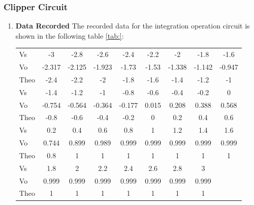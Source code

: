     \subsubsection{Clipper Circuit}
    \begin{enumerate}[I]
        \item \textbf{Data Recorded}\newline
            The recorded data for the integration operation circuit is shown in the following table \ref{tab:}:
            \begin{table}[H]
                \centering
                \begin{tabular}{l|cccccccc}
                    \hline
                    \midrule
                    Vs   & -3     & -2.8   & -2.6   & -2.4   & -2.2  & -2     & -1.8   & -1.6   \\
                    Vo   & -2.317 & -2.125 & -1.923 & -1.73  & -1.53 & -1.338 & -1.142 & -0.947 \\
                    Theo & -2.4   & -2.2   & -2     & -1.8   & -1.6  & -1.4   & -1.2   & -1     \\
                    \midrule
                    \midrule
                    Vs   & -1.4   & -1.2   & -1     & -0.8   & -0.6  & -0.4   & -0.2   & 0      \\
                    Vo   & -0.754 & -0.564 & -0.364 & -0.177 & 0.015 & 0.208  & 0.388  & 0.568  \\
                    Theo & -0.8   & -0.6   & -0.4   & -0.2   & 0     & 0.2    & 0.4    & 0.6    \\
                    \midrule
                    \midrule
                    Vs   & 0.2    & 0.4    & 0.6    & 0.8    & 1     & 1.2    & 1.4    & 1.6    \\
                    Vo   & 0.744  & 0.899  & 0.989  & 0.999  & 0.999 & 0.999  & 0.999  & 0.999  \\
                    Theo & 0.8    & 1      & 1      & 1      & 1     & 1      & 1      & 1      \\
                    \midrule
                    \midrule
                    Vs   & 1.8    & 2      & 2.2    & 2.4    & 2.6   & 2.8    & 3      &        \\
                    Vo   & 0.999  & 0.999  & 0.999  & 0.999  & 0.999 & 0.999  & 0.999  &        \\
                    Theo & 1      & 1      & 1      & 1      & 1     & 1      & 1      &        \\
                    \midrule

\end{tabular}
\end{table}
\end{enumerate}

